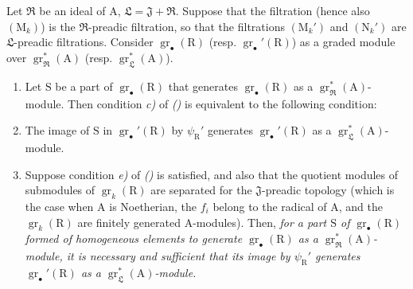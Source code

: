 \begin{corollary}[19.6.4]
\label{IV.19.6.4}
Let $\mathfrak{R}$ be an ideal of $\mathrm{A}$, $\mathfrak{L}=\mathfrak{J}+\mathfrak{R}$. Suppose that the filtration (hence also $(\mathrm{M}_k)$) is the $\mathfrak{R}$-preadic filtration, so that the filtrations $(\mathrm{M}_k')$ and $(\mathrm{N}_k')$ are $\mathfrak{L}$-preadic filtrations. Consider $\operatorname{gr}_\bullet(\mathrm{R})$ (resp. $\operatorname{gr}_\bullet'(\mathrm{R})$) as a graded module over $\operatorname{gr}_\mathfrak{R}^*(\mathrm{A})$ (resp. $\operatorname{gr}_\mathfrak{L}^*(\mathrm{A})$).
\begin{enumerate}
\item[\rm(i)] Let $\mathrm{S}$ be a part of $\operatorname{gr}_\bullet(\mathrm{R})$ that generates $\operatorname{gr}_\bullet(\mathrm{R})$ as a $\operatorname{gr}_\mathfrak{R}^*(\mathrm{A})$-module. Then condition \emph{c)} of \emph{()} is equivalent to the following condition:
\item[\rm c$'$)] The image of $\mathrm{S}$ in $\operatorname{gr}_\bullet'(\mathrm{R})$ by $\psi_\mathrm{R}'$ generates $\operatorname{gr}_\bullet'(\mathrm{R})$ as a $\operatorname{gr}_\mathfrak{L}^*(\mathrm{A})$-module.
\item[\rm(ii)] Suppose condition \emph{e)} of \emph{()} is satisfied, and also that the quotient modules of submodules of $\operatorname{gr}_k(\mathrm{R})$ are separated for the $\mathfrak{J}$-preadic topology (which is the case when $\mathrm{A}$ is Noetherian, the $f_i$ belong to the radical of $\mathrm{A}$, and the $\operatorname{gr}_k(\mathrm{R})$ are finitely generated $\mathrm{A}$-modules). Then, \emph{for a part $\mathrm{S}$ of $\operatorname{gr}_\bullet(\mathrm{R})$ formed of homogeneous elements to generate $\operatorname{gr}_\bullet(\mathrm{R})$ as a $\operatorname{gr}_\mathfrak{R}^*(\mathrm{A})$-module, it is necessary and sufficient that its image by $\psi_\mathrm{R}'$ generates $\operatorname{gr}_\bullet'(\mathrm{R})$ as a $\operatorname{gr}_\mathfrak{L}^*(\mathrm{A})$-module.}
\end{enumerate}
\end{corollary}


